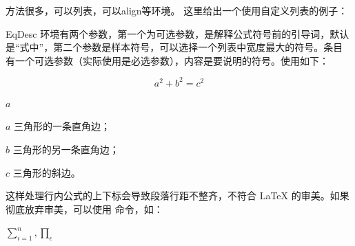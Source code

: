 
方法很多，可以列表，可以align等环境。 这里给出一个使用自定义列表的例子：

\begin{texlist}
\usepackage{ifthen}
\newenvironment{EqDesc}[2][式中]{%
\begin{list}{}
 {%
  \usecounter{qlst}
  \settowidth{\labelwidth}{#1，\ \ #2\ --- \ }
  \setlength{\labelsep}{0pt}
  \setlength{\leftmargin}{\labelwidth}
  \setlength{\rightmargin}{0em}
  \setlength{\parsep}{0ex}
  \setlength{\itemsep}{0ex}
  \setlength{\itemindent}{0em}
  \setlength{\listparindent}{0em}
  \renewcommand{\makelabel}[1]
    {\stepcounter{qlst}
     \ifthenelse{\value{qlst}>1}{\hfill ##1\ --- \ }{#1，\hfill ##1\ --- \ }
    }
 }%
}%
{\end{list}}
\end{texlist}

EqDesc
环境有两个参数，第一个为可选参数，是解释公式符号前的引导词，默认是``式中''，第二个参数是样本符号，可以选择一个列表中宽度最大的符号。条目  有一个可选参数（实际使用是必选参数），内容是要说明的符号。使用如下：

\begin{example}
\[ a^2+b^2=c^2 \]
\begin{EqDesc}[其中]{$a$}
   \item[$a$] 三角形的一条直角边；
   \item[$b$] 三角形的另一条直角边；
   \item[$c$] 三角形的斜边。
\end{EqDesc}
\end{example}




这样处理行内公式的上下标会导致段落行距不整齐，不符合 \LaTeX{}
的审美。如果彻底放弃审美，可以使用  命令，如：

\begin{example}
$\sum\limits_{i=1}^n, \prod\limits_\epsilon$
\end{example}

